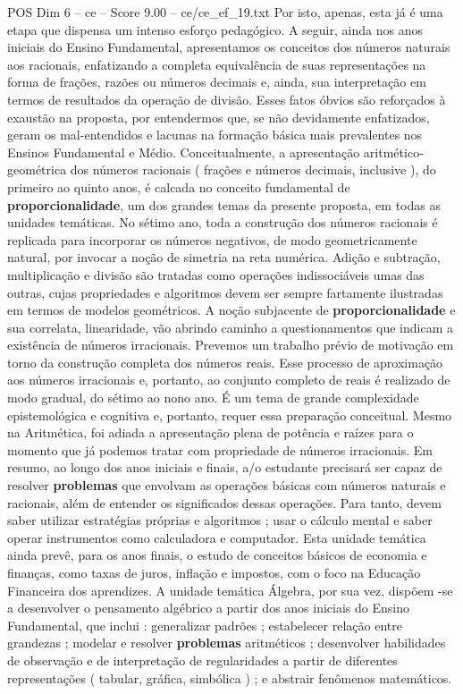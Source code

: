 \begin{textsample}{POS Dim 6 – ce – Score 9.00 – ce/ce\_ef\_19.txt}
Por isto, apenas, esta já é uma etapa que dispensa um intenso esforço pedagógico.
A seguir, ainda nos anos iniciais do Ensino Fundamental, apresentamos os conceitos dos números naturais aos racionais, enfatizando a completa equivalência de suas representações na forma de frações, razões ou números decimais e, ainda, sua interpretação em termos de resultados da operação de divisão.
Esses fatos óbvios são reforçados à exaustão na proposta, por entendermos que, se não devidamente enfatizados, geram os mal-entendidos e lacunas na formação básica mais prevalentes nos Ensinos Fundamental e Médio.
Conceitualmente, a apresentação aritmético-geométrica dos números racionais ( frações e números decimais, inclusive ), do primeiro ao quinto anos, é calcada no conceito fundamental de \textbf{proporcionalidade}, um dos grandes temas da presente proposta, em todas as unidades temáticas.
No sétimo ano, toda a construção dos números racionais é replicada para incorporar os números negativos, de modo geometricamente natural, por invocar a noção de simetria na reta numérica.
Adição e subtração, multiplicação e divisão são tratadas como operações indissociáveis umas das outras, cujas propriedades e algoritmos devem ser sempre fartamente ilustradas em termos de modelos geométricos.
A noção subjacente de \textbf{proporcionalidade} e sua correlata, linearidade, vão abrindo caminho a questionamentos que indicam a existência de números irracionais.
Prevemos um trabalho prévio de motivação em torno da construção completa dos números reais.
Esse processo de aproximação aos números irracionais e, portanto, ao conjunto completo de reais é realizado de modo gradual, do sétimo ao nono ano.
É um tema de grande complexidade epistemológica e cognitiva e, portanto, requer essa preparação conceitual.
Mesmo na Aritmética, foi adiada a apresentação plena de potência e raízes para o momento que já podemos tratar com propriedade de números irracionais.
Em resumo, ao longo dos anos iniciais e finais, a/o estudante precisará ser capaz de resolver \textbf{problemas} que envolvam as operações básicas com números naturais e racionais, além de entender os significados dessas operações.
Para tanto, devem saber utilizar estratégias próprias e algoritmos ; usar o cálculo mental e saber operar instrumentos como calculadora e computador.
Esta unidade temática ainda prevê, para os anos finais, o estudo de conceitos básicos de economia e finanças, como taxas de juros, inflação e impostos, com o foco na Educação Financeira dos aprendizes.
A unidade temática Álgebra, por sua vez, dispõem -se a desenvolver o pensamento algébrico a partir dos anos iniciais do Ensino Fundamental, que inclui : generalizar padrões ; estabelecer relação entre grandezas ; modelar e resolver \textbf{problemas} aritméticos ; desenvolver habilidades de observação e de interpretação de regularidades a partir de diferentes representações ( tabular, gráfica, simbólica ) ; e abstrair fenômenos matemáticos.

\end{textsample}
